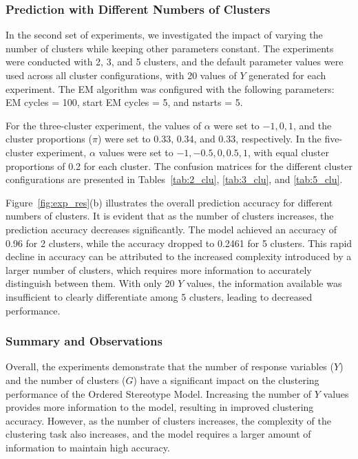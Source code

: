 \documentclass{article}
\begin{document}
\subsubsection*{Prediction with Different Numbers of Clusters}

In the second set of experiments, we investigated the impact of varying the number of clusters while keeping other parameters constant. 
The experiments were conducted with 2, 3, and 5 clusters, and the default parameter values were used across all cluster configurations, with 20 values of \( Y \) generated for each experiment. 
The EM algorithm was configured with the following parameters: EM cycles = 100, start EM cycles = 5, and nstarts = 5.

For the three-cluster experiment, the values of \(\alpha\) were set to \(-1, 0, 1\), and the cluster proportions (\(\pi\)) were set to 0.33, 0.34, and 0.33, respectively. 
In the five-cluster experiment, \(\alpha\) values were set to \(-1, -0.5, 0, 0.5, 1\), with equal cluster proportions of 0.2 for each cluster. 
The confusion matrices for the different cluster configurations are presented in Tables~\ref{tab:2_clu}, \ref{tab:3_clu}, and \ref{tab:5_clu}.

Figure~\ref{fig:exp_res}(b) illustrates the overall prediction accuracy for different numbers of clusters. 
It is evident that as the number of clusters increases, the prediction accuracy decreases significantly. 
The model achieved an accuracy of 0.96 for 2 clusters, while the accuracy dropped to 0.2461 for 5 clusters. 
This rapid decline in accuracy can be attributed to the increased complexity introduced by a larger number of clusters, which requires more information to accurately distinguish between them. 
With only 20 \( Y \) values, the information available was insufficient to clearly differentiate among 5 clusters, leading to decreased performance.

\subsubsection*{Summary and Observations}

Overall, the experiments demonstrate that the number of response variables (\( Y \)) and the number of clusters (\( G \)) have a significant impact on the clustering performance of the Ordered Stereotype Model. 
Increasing the number of \( Y \) values provides more information to the model, resulting in improved clustering accuracy. 
However, as the number of clusters increases, the complexity of the clustering task also increases, and the model requires a larger amount of information to maintain high accuracy.
\end{document}
